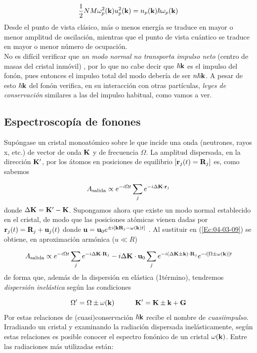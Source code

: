 \begin{equation}
    \frac{1}{2} N M \omega_p^2 (\mathbf{k}) u_p^2 (\mathbf{k}) = n_p (\mathbf{k}) \hbar \omega_p (\mathbf{k})
\end{equation}
Desde el punto de vista clásico, más o menos energía se traduce en mayor o menor amplitud de oscilación, mientras que el punto de vista cuántico se traduce en mayor o menor número de ocupación. \\

No es difícil verificar que \textit{un modo normal no transporta impulso neto} (centro de masas del cristal inmóvil) , por lo que no cabe decir que $\hbar \mathbf{k}$ es el impulso del fonón, pues entonces el impulso total del modo debería de ser $n \hbar \mathbf{k}$. A pesar de esto $\hbar \mathbf{k}$ del fonón verifica, en su interacción con otras partículas, \textit{leyes de conservación} similares a las del impulso habitual, como vamos a ver.

\subsection{Espectroscopía de fonones}

Supóngase un cristal monoatómico sobre le que incide una onda (neutrones, rayos x, etc.) de vector de onda $\mathbf{K}$ y de frecuencia $\Omega$. La amplitud dispersada, en la dirección $\mathbf{K}'$, por los átomos en posiciones de equilibrio $[\mathbf{r}_j (t)= \mathbf{R}_j]$ es, como sabemos

\begin{equation}
    A_{\text{salida}} \propto e^{-i \Omega t } \sum_j e^{-i \Delta \mathbf{K} \cdot \mathbf{r}_j} \label{Ec:04-03-09}
\end{equation}
donde $\Delta \mathbf{K} = \mathbf{K} ' - \mathbf{K}$. Supongamos ahora que existe un modo normal establecido en el cristal, de modo que las posiciones atómicas vienen dadas por $\mathbf{r}_j(t) = \mathbf{R}_j + \mathbf{u}_j (t)$ donde $\mathbf{u}=\mathbf{u}_0  e^{\pm i \left[ \mathbf{k} \mathbf{R}_j -  \omega (\mathbf{k})t \right]}$ . Al sustituir en (\ref{Ec:04-03-09}) se obtiene, en aproximación armónica ($u \ll R$) 

\begin{equation}
    A_{\text{salida}} \propto e^{-i\Omega t} \sum_j e^{-i\Delta \mathbf{K} \cdot \mathbf{R}_j} - i \Delta \mathbf{K} \cdot \mathbf{u}_0 \sum_j e^{- i (\Delta \mathbf{K} \pm \mathbf{k}) \cdot \mathbf{R}_j} e^{- i \left[ \Omega \pm \omega (\mathbf{k}) \right]t}
\end{equation}
de forma que, además de la dispersión en elástica (1\er término), tendremos \textit{dispersión inelástica} según las condiciones 

\begin{equation}
    \Omega' = \Omega \pm \omega (\mathbf{k}) \quad \quad \quad \mathbf{K}' = \mathbf{K} \pm \mathbf{k} + \mathbf{G}
\end{equation}
Por estas relaciones de (cuasi)conservación $\hbar \mathbf{k}$ recibe el nombre de \textit{cuasiimpulso}. Irradiando un cristal y examinando la radiación dispersada inelásticamente, según estas relaciones es posible conocer el espectro fonónico de un cristal $\omega (\mathbf{k})$. Entre las radiaciones más utilizadas están:

